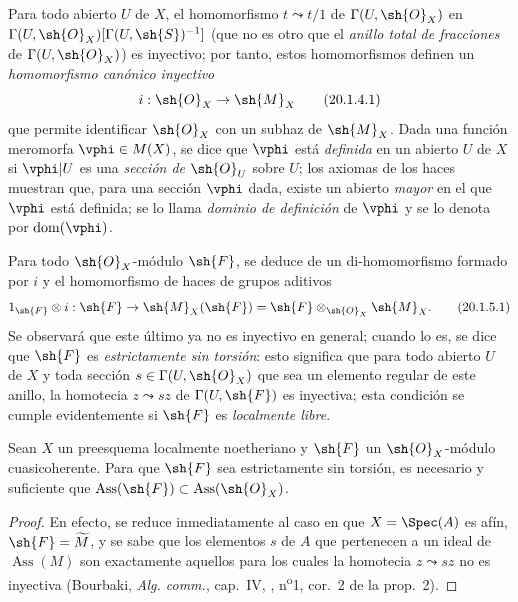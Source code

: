 \begin{env}[20.1.4]
\label{IV.20.1.4}
Para todo abierto $U$ de $X$, el homomorfismo $t\leadsto t/1$ de $\Gamma(U,\sh{O}_X)$ en $\Gamma(U,\sh{O}_X)[\Gamma(U,\sh{S})^{-1}]$ (que no es otro que el \emph{anillo total de fracciones} de
$\Gamma(U,\sh{O}_X)$) es inyectivo; por tanto, estos homomorfismos definen un \emph{homomorfismo canónico inyectivo}
\[
\label{IV.20.1.4.1}
  i:\sh{O}_X\to\sh{M}_X
  \tag{20.1.4.1}
\]
que permite identificar $\sh{O}_X$ con un subhaz de $\sh{M}_X$.
Dada una función meromorfa $\vphi\in M(X)$, se dice que $\vphi$ está \emph{definida} en un abierto $U$ de $X$ si $\vphi|U$ es una \emph{sección de $\sh{O}_U$} sobre $U$; los axiomas de los haces muestran que, para una sección $\vphi$ dada, existe un abierto \emph{mayor} en el que $\vphi$ está definida; se lo llama \emph{dominio de definición} de $\vphi$ y se lo denota por $\operatorname{dom}(\vphi)$.
\end{env}

\begin{env}[20.1.5]
\label{IV.20.1.5}
Para todo $\sh{O}_X$-módulo $\sh{F}$, se deduce de  un di-homomorfismo formado por $i$ y el homomorfismo de haces de grupos aditivos
\[
\label{IV.20.1.5.1}
  1_{\sh{F}}\otimes i:\sh{F}\to\sh{M}_X(\sh{F})=\sh{F}\otimes_{\sh{O}_X}\sh{M}_X.
  \tag{20.1.5.1}
\]
Se observará que este último ya no es inyectivo en general; cuando lo es, se dice que $\sh{F}$ es \emph{estrictamente sin torsión}: esto significa que para todo abierto $U$ de $X$ y toda sección $s\in\Gamma(U,\sh{O}_X)$ que sea un elemento regular de este anillo, la homotecia $z\leadsto sz$ de $\Gamma(U,\sh{F})$ es inyectiva; esta condición se cumple evidentemente si $\sh{F}$ es \emph{localmente libre}.
\end{env}

\begin{proposition}[20.1.6]
\label{IV.20.1.6}
Sean $X$ un preesquema localmente noetheriano y $\sh{F}$ un $\sh{O}_X$-módulo cuasicoherente.
Para que $\sh{F}$ sea estrictamente sin torsión, es necesario y suficiente que $\operatorname{Ass}(\sh{F})\subset\operatorname{Ass}(\sh{O}_X)$.
\end{proposition}

\begin{proof}
En efecto, se reduce inmediatamente al caso en que $X=\Spec(A)$ es afín, $\sh{F}=\widetilde M$, y se sabe que los elementos $s$ de $A$ que pertenecen a un ideal de $\operatorname{Ass}(M)$ son exactamente aquellos para los cuales la homotecia $z\leadsto sz$ no es inyectiva (Bourbaki, \emph{Alg. comm.}, cap.~IV, , n\textsuperscript{o}1, cor.~2 de la prop.~2).
\end{proof}

